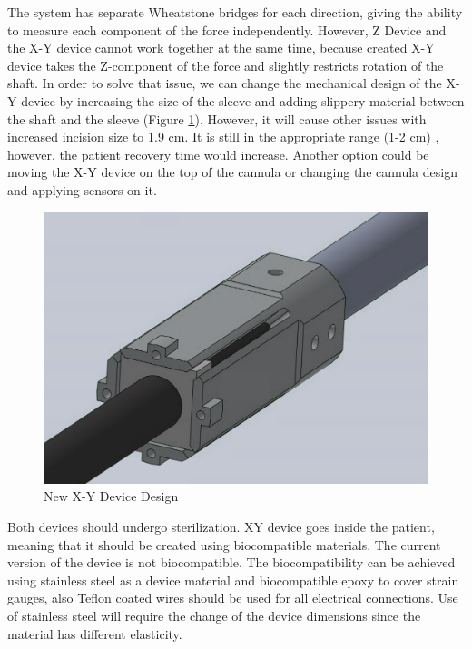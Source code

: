The system has separate Wheatstone bridges for each direction, giving the ability to measure each component of the force independently. However, Z Device and the X-Y device cannot work together at the same time, because created X-Y device takes the Z-component of the force and slightly restricts rotation of the shaft. In order to solve that issue, we can change the mechanical design of the X-Y device by increasing the size of the sleeve and adding slippery material between the shaft and the sleeve (Figure \ref{fig:NewXYDesign}). However, it will cause other issues with increased incision size to 1.9 cm. It is still in the appropriate range (1-2 cm) \cite{_laparoscopy}, however, the patient recovery time would increase. Another option could be moving the X-Y device on the top of the cannula or changing the cannula design and applying sensors on it.

\begin{figure}[h]
	\begin{center}
		\includegraphics[width=120mm]{fig/methods/new_xy_dev.png}
	\end{center}
	\vspace{-4mm}
	\caption[New X-Y Device Design]
	{New X-Y Device Design}
	\label{fig:NewXYDesign}
	\vspace{-2mm}
\end{figure}
	
	Both devices should undergo sterilization. XY device goes inside the patient, meaning that it should be created using biocompatible materials. The current version of the device is not biocompatible. The biocompatibility can be achieved using stainless steel as a device material and biocompatible epoxy to cover strain gauges, also Teflon coated wires should be used for all electrical connections. Use of stainless steel will require the change of the device dimensions since the material has different elasticity.
	
